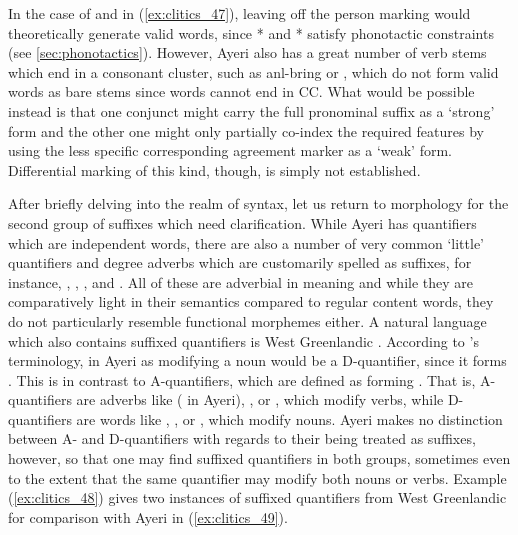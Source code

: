 In the case of  and  in
(\ref{ex:clitics_47}), leaving off the person marking would theoretically
generate valid words, since * and * satisfy
phonotactic constraints (see \autoref{sec:phonotactics}). However, Ayeri also
has a great number of verb stems which end in a consonant cluster, such as
 {anl-}{bring} or , which do not form valid
words as bare stems since words cannot end in CC. What would be possible
instead is that one conjunct might carry the full pronominal suffix as a
`strong' form and the other one might only partially co-index the required
features by using the less specific corresponding agreement marker as a `weak'
form. Differential marking of this kind, though, is simply not established.

After briefly delving into the realm of syntax, let us return to morphology for
the second group of suffixes which need clarification. While Ayeri has
quantifiers which are independent words, there are also a number of very common
`little' quantifiers and degree adverbs which are customarily spelled as
suffixes, for instance, ,
, , and
. All of these are adverbial in meaning and while they
are comparatively light in their semantics compared to regular content words,
they do not particularly resemble functional morphemes either. A natural
language which also contains suffixed quantifiers is West Greenlandic
\citep{bittner1995}. According to \citet{bittner1995}'s terminology,
 in Ayeri as modifying a noun would be a D-quantifier, since
it forms .
This is in contrast to A-quantifiers, which are defined as forming
. That is,
A-quantifiers are adverbs like  ( in Ayeri),
, or , which modify verbs, while D-quantifiers are words
like , , or , which modify nouns. Ayeri makes no
distinction between A- and D-quantifiers with regards to their being treated as
suffixes, however, so that one may find suffixed quantifiers in both groups,
sometimes even to the extent that the same quantifier may modify both nouns or
verbs. Example (\ref{ex:clitics_48}) gives two instances of suffixed
quantifiers from West Greenlandic for comparison with Ayeri in
(\ref{ex:clitics_49}).

